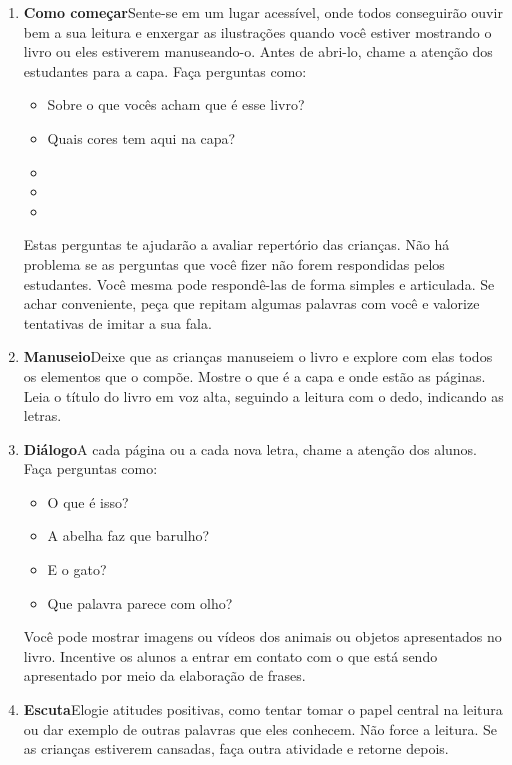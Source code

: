 \documentclass[11pt]{extarticle}
\begin{document}
\begin{enumerate}
\item \textbf{Como começar}\quad Sente-se em um lugar acessível, 
onde todos conseguirão ouvir bem a sua leitura e enxergar as ilustrações 
quando você estiver mostrando o livro ou eles estiverem manuseando-o. 
Antes de abri-lo, chame a atenção dos estudantes para a capa. 
Faça perguntas como: 

\begin{itemize}
\item Sobre o que vocês acham que é esse livro?
\item Quais cores tem aqui na capa?
\item 
\item 
\item 
\end{itemize}

Estas perguntas te ajudarão a avaliar repertório das crianças. 
Não há problema se as perguntas que você fizer não forem respondidas pelos 
estudantes. Você mesma pode respondê-las de forma simples e articulada. Se achar 
conveniente, peça que repitam algumas palavras com você e valorize tentativas 
de imitar a sua fala. 
 
\item \textbf{Manuseio}\quad Deixe que as crianças manuseiem o livro 
e explore com elas todos os elementos que o compõe. Mostre o que é a 
capa e onde estão as páginas. Leia o título do livro em voz alta, seguindo 
a leitura com o dedo, indicando as letras. 

\item \textbf{Diálogo}\quad A cada página ou a cada nova letra,
chame a atenção dos alunos. Faça perguntas como:

\begin{itemize}
\item O que é isso?
\item A abelha faz que barulho?
\item E o gato?
\item Que palavra parece com olho?
\end{itemize}

Você pode mostrar imagens ou vídeos dos animais ou objetos
apresentados no livro. Incentive os alunos a entrar
em contato com o que está sendo apresentado por meio da 
elaboração de frases. 

\item \textbf{Escuta}\quad Elogie atitudes positivas, como 
tentar tomar o papel central na leitura ou dar exemplo de outras
palavras que eles conhecem. Não force a leitura. Se as crianças 
estiverem cansadas, faça outra atividade e retorne depois. 


\end{enumerate}
\end{document}
